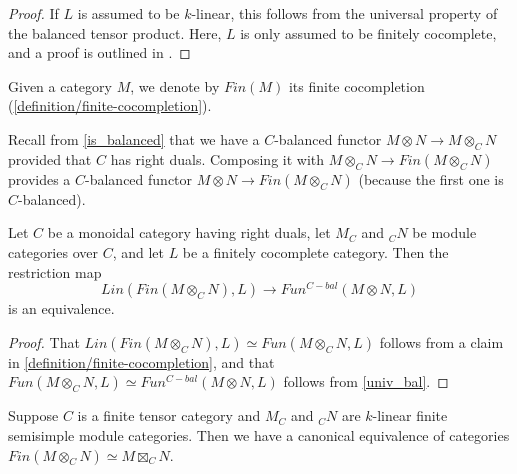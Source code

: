 \begin{proof}
  If $L$ is assumed to be $k$-linear, this follows from the universal property
  of the balanced tensor product. Here, $L$ is only assumed to be finitely
  cocomplete, and a proof is outlined in \cite[Remark 3.4]{douglas/balanced-product}.
\end{proof}

\begin{notation}
  Given a category $M$, we denote by $Fin(M)$ its finite cocompletion
  (\ref{definition/finite-cocompletion}).
\end{notation}

\noindent Recall from \ref{is_balanced} that we have a $C$-balanced functor $M
\otimes N \to M\otimes_C N$ provided that $C$ has right duals. Composing it
with $M\otimes_C N \to Fin(M\otimes_C N)$ provides a $C$-balanced functor
$M\otimes N\to Fin(M\otimes_C N)$ (because the first one is $C$-balanced).

\begin{lemma}\label{univ_finbal}

  \noindent Let $C$ be a monoidal category having right duals, let $M_C$ and $_{C}N$ be
  module categories over $C$, and let $L$ be a finitely cocomplete category.
  Then the restriction map $$Lin(Fin(M\otimes_C N),L)\to Fun^{C-bal}(M\otimes
  N,L)$$ is an equivalence.
\end{lemma}

\begin{proof}
  That $Lin(Fin(M\otimes_C N),L) \simeq Fun(M \otimes_{C} N, L)$ follows from
  a claim in \ref{definition/finite-cocompletion}, and that $Fun(M \otimes_{C}
  N, L) \simeq Fun^{C-bal}(M \otimes N, L)$ follows from \ref{univ_bal}.
\end{proof}

\begin{proposition}\label{fin_eq_bal}

  Suppose $C$ is a finite tensor category and $M_C$ and $_{C}N$ are $k$-linear
  finite semisimple module categories. Then we have a canonical equivalence of
  categories $Fin(M\otimes_C N) \simeq M\boxtimes_C N$.
\end{proposition}

